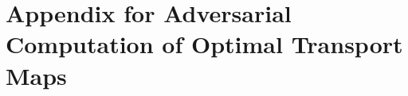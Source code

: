 \documentclass[runningheads]{llncs}
\begin{document}
%
%
%
% 


%
%


\appendix

\section{Appendix for Adversarial Computation of Optimal Transport Maps}

\end{document}
